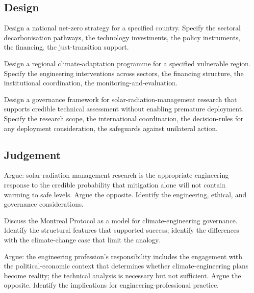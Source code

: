\subsection*{Design}

\begin{exercise}
Design a national net-zero strategy for a specified country. Specify the sectoral decarbonisation pathways, the technology investments, the policy instruments, the financing, the just-transition support.
\end{exercise}

\begin{exercise}
Design a regional climate-adaptation programme for a specified vulnerable region. Specify the engineering interventions across sectors, the financing structure, the institutional coordination, the monitoring-and-evaluation.
\end{exercise}

\begin{exercise}
Design a governance framework for solar-radiation-management research that supports credible technical assessment without enabling premature deployment. Specify the research scope, the international coordination, the decision-rules for any deployment consideration, the safeguards against unilateral action.
\end{exercise}

\subsection*{Judgement}

\begin{exercise}
Argue: solar-radiation management research is the appropriate engineering response to the credible probability that mitigation alone will not contain warming to safe levels. Argue the opposite. Identify the engineering, ethical, and governance considerations.
\end{exercise}

\begin{exercise}
Discuss the Montreal Protocol as a model for climate-engineering governance. Identify the structural features that supported success; identify the differences with the climate-change case that limit the analogy.
\end{exercise}

\begin{exercise}
Argue: the engineering profession's responsibility includes the engagement with the political-economic context that determines whether climate-engineering plans become reality; the technical analysis is necessary but not sufficient. Argue the opposite. Identify the implications for engineering-professional practice.
\end{exercise}


